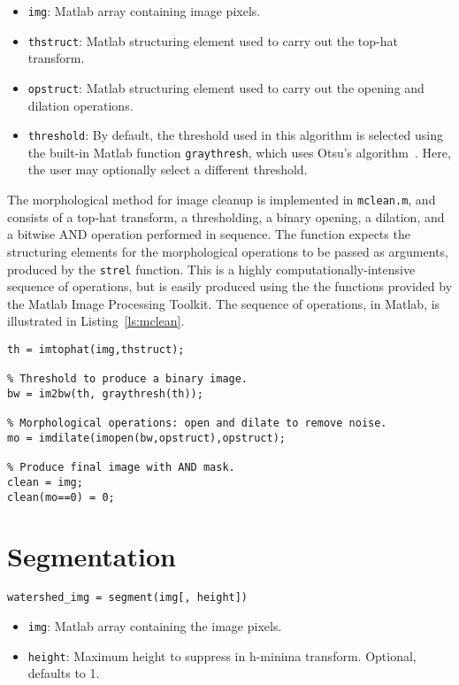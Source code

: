 \begin{itemize}
\item \texttt{img}: Matlab array containing image pixels.
\item \texttt{thstruct}: Matlab structuring element used to carry out the top-hat transform.
\item \texttt{opstruct}: Matlab structuring element used to carry out the opening and dilation operations.
\item \texttt{threshold}: By default, the threshold used in this algorithm is selected using the built-in
Matlab function \texttt{graythresh}, which uses Otsu's algorithm~\cite{otsu-threshold}. Here, the user may optionally
select a different threshold.
\end{itemize}


The morphological method for image cleanup is implemented in \texttt{mclean.m}, and consists of a top-hat transform,
a thresholding, a binary opening, a dilation, and a bitwise AND operation performed in sequence.  
The function expects the structuring elements for the morphological operations
to be passed as arguments, produced by the 
\texttt{strel} function.  This is a 
highly computationally-intensive sequence of operations, but is easily produced using the the functions provided
by the Matlab Image Processing Toolkit.  The sequence of operations, in Matlab, is illustrated in 
Listing~\ref{ls:mclean}.

\begin{lstlisting}[label=ls:mclean,caption=Morphological image cleanup]
% Even out illumination using top-hat transform.
th = imtophat(img,thstruct);

% Threshold to produce a binary image.
bw = im2bw(th, graythresh(th));

% Morphological operations: open and dilate to remove noise.
mo = imdilate(imopen(bw,opstruct),opstruct);

% Produce final image with AND mask.
clean = img;
clean(mo==0) = 0;
\end{lstlisting}

\section{Segmentation}

\texttt{watershed\_img = segment(img[, height])}

\begin{itemize}
\item \texttt{img}: Matlab array containing the image pixels.
\item \texttt{height}: Maximum height to suppress in h-minima transform. Optional, defaults to 1.
\end{itemize}



